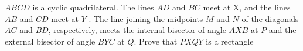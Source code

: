 $ABCD$ is a cyclic quadrilateral. The lines $AD$ and $BC$ meet at X, and the lines $AB$ and $CD$ meet at $Y$ . The line joining the midpoints $M$ and $N$ of the diagonals $AC$ and $BD$, respectively, meets the internal bisector of angle $AXB$ at $P$ and the external bisector of angle $BYC$ at $Q$. Prove that $PXQY$ is a rectangle